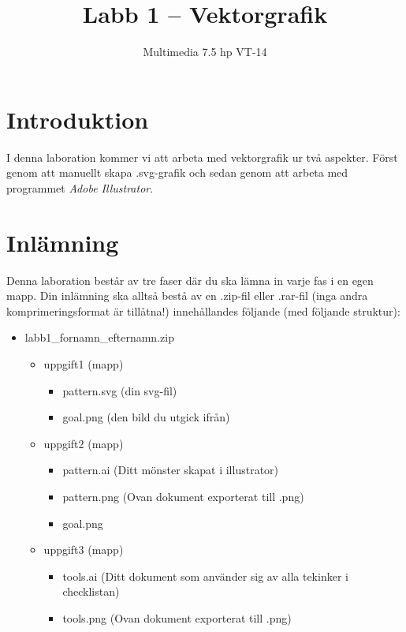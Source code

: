 \documentclass[12pt]{article}
\date{}
\title{ Labb 1 -- Vektorgrafik }
\author{ Multimedia 7.5 hp VT-14 }
\begin{document}
\maketitle
\vspace{-2em}



\section{Introduktion}
I denna laboration kommer vi att arbeta med vektorgrafik ur två aspekter. Först genom att manuellt skapa .svg-grafik och sedan genom att arbeta med programmet \emph{Adobe Illustrator}.

\section{Inlämning}
Denna laboration består av tre faser där du ska lämna in varje fas i en egen mapp. Din inlämning ska alltså bestå av en .zip-fil eller .rar-fil (inga andra komprimeringsformat är tillåtna!) innehållandes följande (med följande struktur):
  \begin{itemize}
    \item labb1\_fornamn\_efternamn.zip

      \begin{itemize}
        \item uppgift1 (mapp)
          \begin{itemize}
            \item pattern.svg (din svg-fil)
            \item goal.png (den bild du utgick ifrån)
          \end{itemize}

        \item uppgift2 (mapp)
          \begin{itemize}
            \item pattern.ai (Ditt mönster skapat i illustrator)
            \item pattern.png (Ovan dokument exporterat till .png)
            \item goal.png
          \end{itemize}

        \item uppgift3 (mapp)
          \begin{itemize}
            \item tools.ai (Ditt dokument som använder sig av alla tekinker i checklistan)
            \item tools.png (Ovan dokument exporterat till .png)
          \end{itemize}

    \end{itemize}

  \end{itemize}
\end{document}
